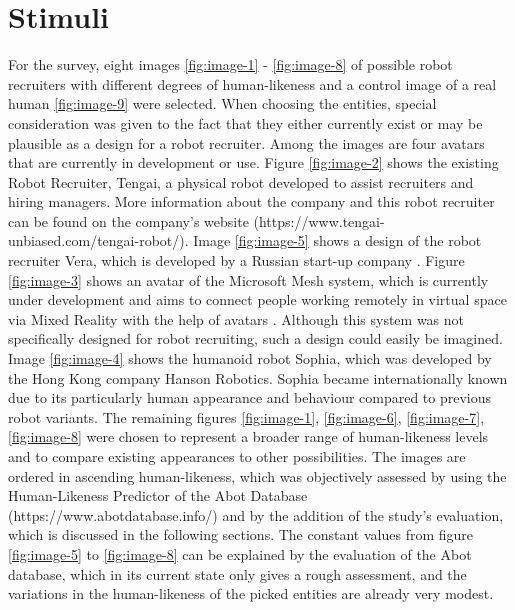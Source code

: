 \section{Stimuli}
For the survey, eight images \ref{fig:image-1} - \ref{fig:image-8} of possible robot recruiters with different degrees of human-likeness and a control image of a real human \ref{fig:image-9} were selected. When choosing the entities, special consideration was given to the fact that they either currently exist or may be plausible as a design for a robot recruiter. Among the images are four avatars that are currently in development or use. Figure \ref{fig:image-2} shows the existing Robot Recruiter, Tengai, a physical robot developed to assist recruiters and hiring managers. More information about the company and this robot recruiter can be found on the company's website (https://www.tengai-unbiased.com/tengai-robot/). Image \ref{fig:image-5} shows a design of the robot recruiter Vera, which is developed by a Russian start-up company \cite{vera}. Figure \ref{fig:image-3} shows an avatar of the Microsoft Mesh system, which is currently under development and aims to connect people working remotely in virtual space via Mixed Reality with the help of avatars \cite{microsoft_mesh}. Although this system was not specifically designed for robot recruiting, such a design could easily be imagined. Image \ref{fig:image-4} shows the humanoid robot Sophia, which was developed by the Hong Kong company Hanson Robotics. Sophia became internationally known due to its particularly human appearance and behaviour compared to previous robot variants. The remaining figures \ref{fig:image-1}, \ref{fig:image-6}, \ref{fig:image-7}, \ref{fig:image-8} were chosen to represent a broader range of human-likeness levels and to compare existing appearances to other possibilities. The images are ordered in ascending human-likeness, which was objectively assessed by using the Human-Likeness Predictor of the Abot Database (https://www.abotdatabase.info/) and by the addition of the study's evaluation, which is discussed in the following sections. The constant values from figure \ref{fig:image-5} to \ref{fig:image-8} can be explained by the evaluation of the Abot database, which in its current state only gives a rough assessment, and the variations in the human-likeness of the picked entities are already very modest.
\begin{table}[b!]
\centering
{}
\caption{Rated human-likeness of the figures.}
\label{tab:rated-human-likeness}
\end{table}
\newpage

